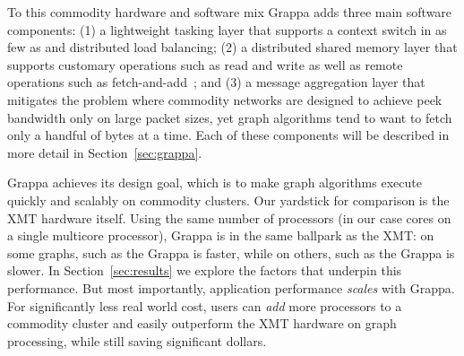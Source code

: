 To this commodity hardware and software mix Grappa adds three main software components: (1) a lightweight tasking layer that supports a context switch in as few as  and distributed load balancing; (2) a distributed shared memory layer that supports customary operations such as read and write as well as remote operations such as fetch-and-add~\cite{fetchandadd}; and (3) a message aggregation layer that mitigates the problem where commodity networks are designed to achieve peek bandwidth only on large packet sizes, yet graph algorithms tend to want to fetch only a handful of bytes at a time.  Each of these components will be described in more detail in Section~\ref{sec:grappa}.

Grappa achieves its design goal, which is to make graph algorithms execute quickly and scalably on commodity clusters.  Our yardstick for comparison is the XMT hardware itself.  Using the same number of processors (in our case cores on a single multicore processor), Grappa is in the same ballpark as the XMT: on some graphs, such as the  Grappa is  faster, while on others, such as the  Grappa is  slower.  In Section~\ref{sec:results} we explore the factors that underpin this performance.  But most importantly, application performance \emph{scales} with Grappa.  For significantly less real world cost, users can \emph{add} more processors to a commodity cluster and easily outperform the XMT hardware on graph processing, while still saving significant dollars.

